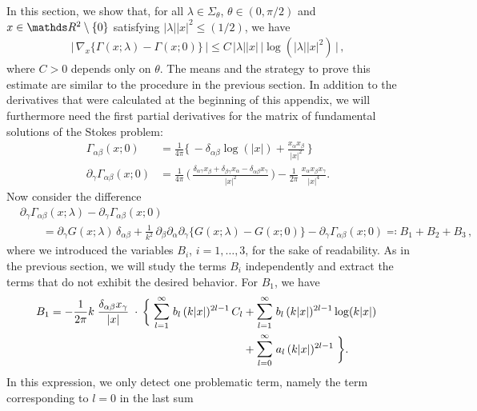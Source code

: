 In this section, we show that, for all $\lambda \in \Sigma_\theta$, $\theta \in (0,\pi/2)$ and $x \in \R^2\setminus \{0\}$ satisfying $|\lambda| |x|^2 \leq (1/2)$, we have
\begin{align*}
  \Big|\, \nabla_x \big\{ \Gamma(x; \lambda) - \Gamma(x; 0) \big\} \, \Big| \leq C\, |\lambda| |x| \, \big|\log(|\lambda| |x|^2)\,\big|\,,
\end{align*}
where $C > 0$ depends only on $\theta$.
The means and the strategy to prove this estimate are similar to the procedure in the previous section.
In addition to the derivatives that were calculated at the beginning of this appendix, we will furthermore need the first partial derivatives for the matrix of fundamental solutions of the Stokes problem:
\begin{align*}
    \Gamma_{\alpha\beta}(x; 0) 
    &= \frac{1}{4\pi} \bigg\{ \,- \delta_{\alpha\beta} \log(|x|) + \frac{x_\alpha x_\beta}{|x|^2} \,\bigg\}
    \\[0.5em]
  \partial_\gamma \Gamma_{\alpha\beta} (x; 0) 
  &= \frac{1}{4 \pi}\, \bigg(\, \frac{\delta_{\alpha\gamma} x_\beta + \delta_{\beta\gamma} x_\alpha  - \delta_{\alpha\beta} x_\gamma}{|x|^2}  \, \bigg) 
  - \frac{1}{2\pi}\, \frac{x_\alpha x_\beta x_\gamma}{|x|^4} .
\end{align*}
Now consider the difference
\begin{align*}
  &\partial_\gamma \Gamma_{\alpha\beta}(x; \lambda) - \partial_\gamma \Gamma_{\alpha\beta}(x; 0) \\
  &\qquad=\partial_\gamma G(x; \lambda) \,\delta_{\alpha\beta}
  + \frac{1}{k^2} \, \partial_\beta \partial_\alpha \partial_\gamma \Big\{ G(x; \lambda) - G(x; 0) \Big\} 
  - \partial_\gamma \Gamma_{\alpha\beta}(x; 0) \eqqcolon B_1 + B_2 + B_3 \,,
\end{align*}
where we introduced the variables $B_i$, $i = 1,\dots,3$, for the sake of readability.
As in the previous section, we will study the terms $B_i$ independently and extract the terms that do not exhibit the desired behavior.
For $B_1$, we have
\begin{align*}
  B_1 = -\frac{1}{2\pi} k\;  \frac{\delta_{\alpha\beta} x_\gamma}{|x|}  \;
  \cdot \,\bigg\{ \;
  \mathlarger{\sum}_{l = 1}^\infty \; b_l \, (k|x|)^{2l - 1} \, C_l 
  &+ \mathlarger{\sum}_{l = 1}^\infty \; b_l \, (k|x|)^{2l - 1} \log(k|x|) \; \\
  &+  \mathlarger{\sum}_{l = 0}^\infty \; a_l \, (k|x|)^{2l - 1} \; \bigg\}.
\end{align*}
In this expression, we only detect one problematic term, namely the term corresponding to $l = 0$ in the last sum
